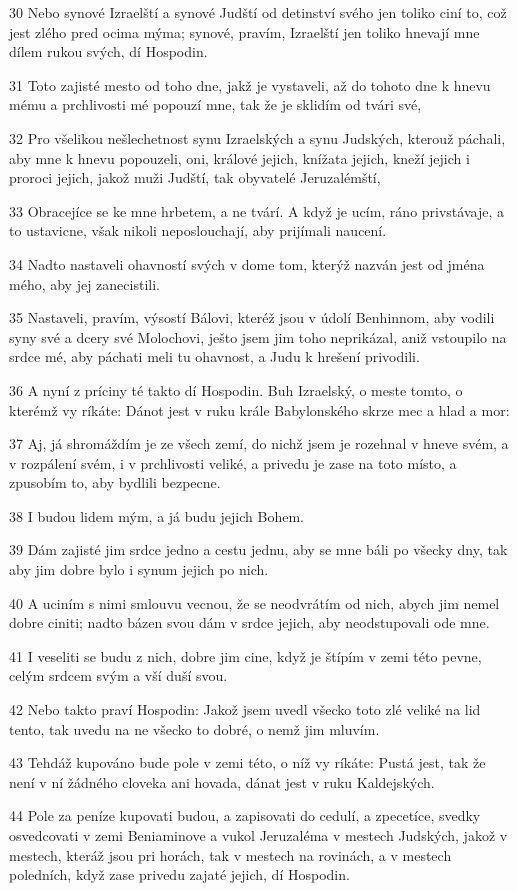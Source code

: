 \par 30 Nebo synové Izraelští a synové Judští od detinství svého jen toliko ciní to, což jest zlého pred ocima mýma; synové, pravím, Izraelští jen toliko hnevají mne dílem rukou svých, dí Hospodin.
\par 31 Toto zajisté mesto od toho dne, jakž je vystaveli, až do tohoto dne k hnevu mému a prchlivosti mé popouzí mne, tak že je sklidím od tvári své,
\par 32 Pro všelikou nešlechetnost synu Izraelských a synu Judských, kterouž páchali, aby mne k hnevu popouzeli, oni, králové jejich, knížata jejich, kneží jejich i proroci jejich, jakož muži Judští, tak obyvatelé Jeruzalémští,
\par 33 Obracejíce se ke mne hrbetem, a ne tvárí. A když je ucím, ráno privstávaje, a to ustavicne, však nikoli neposlouchají, aby prijímali naucení.
\par 34 Nadto nastaveli ohavností svých v dome tom, kterýž nazván jest od jména mého, aby jej zanecistili.
\par 35 Nastaveli, pravím, výsostí Bálovi, kteréž jsou v údolí Benhinnom, aby vodili syny své a dcery své Molochovi, ješto jsem jim toho neprikázal, aniž vstoupilo na srdce mé, aby páchati meli tu ohavnost, a Judu k hrešení privodili.
\par 36 A nyní z príciny té takto dí Hospodin. Buh Izraelský, o meste tomto, o kterémž vy ríkáte: Dánot jest v ruku krále Babylonského skrze mec a hlad a mor:
\par 37 Aj, já shromáždím je ze všech zemí, do nichž jsem je rozehnal v hneve svém, a v rozpálení svém, i v prchlivosti veliké, a privedu je zase na toto místo, a zpusobím to, aby bydlili bezpecne.
\par 38 I budou lidem mým, a já budu jejich Bohem.
\par 39 Dám zajisté jim srdce jedno a cestu jednu, aby se mne báli po všecky dny, tak aby jim dobre bylo i synum jejich po nich.
\par 40 A uciním s nimi smlouvu vecnou, že se neodvrátím od nich, abych jim nemel dobre ciniti; nadto bázen svou dám v srdce jejich, aby neodstupovali ode mne.
\par 41 I veseliti se budu z nich, dobre jim cine, když je štípím v zemi této pevne, celým srdcem svým a vší duší svou.
\par 42 Nebo takto praví Hospodin: Jakož jsem uvedl všecko toto zlé veliké na lid tento, tak uvedu na ne všecko to dobré, o nemž jim mluvím.
\par 43 Tehdáž kupováno bude pole v zemi této, o níž vy ríkáte: Pustá jest, tak že není v ní žádného cloveka ani hovada, dánat jest v ruku Kaldejských.
\par 44 Pole za peníze kupovati budou, a zapisovati do cedulí, a zpecetíce, svedky osvedcovati v zemi Beniaminove a vukol Jeruzaléma v mestech Judských, jakož v mestech, kteráž jsou pri horách, tak v mestech na rovinách, a v mestech poledních, když zase privedu zajaté jejich, dí Hospodin.

